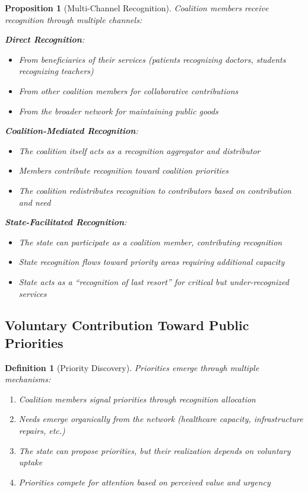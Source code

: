 \documentclass[11pt]{article}
\newtheorem{definition}{Definition}
\newtheorem{proposition}{Proposition}
\begin{document}
\begin{proposition}[Multi-Channel Recognition]
Coalition members receive recognition through multiple channels:

\textbf{Direct Recognition}:
\begin{itemize}
\item From beneficiaries of their services (patients recognizing doctors, students recognizing teachers)
\item From other coalition members for collaborative contributions
\item From the broader network for maintaining public goods
\end{itemize}

\textbf{Coalition-Mediated Recognition}:
\begin{itemize}
\item The coalition itself acts as a recognition aggregator and distributor
\item Members contribute recognition toward coalition priorities
\item The coalition redistributes recognition to contributors based on contribution and need
\end{itemize}

\textbf{State-Facilitated Recognition}:
\begin{itemize}
\item The state can participate as a coalition member, contributing recognition
\item State recognition flows toward priority areas requiring additional capacity
\item State acts as a ``recognition of last resort'' for critical but under-recognized services
\end{itemize}
\end{proposition}

\subsection{Voluntary Contribution Toward Public Priorities}

\begin{definition}[Priority Discovery]
Priorities emerge through multiple mechanisms:
\begin{enumerate}
\item Coalition members signal priorities through recognition allocation
\item Needs emerge organically from the network (healthcare capacity, infrastructure repairs, etc.)
\item The state can propose priorities, but their realization depends on voluntary uptake
\item Priorities compete for attention based on perceived value and urgency
\end{enumerate}
\end{definition}
\end{document}

